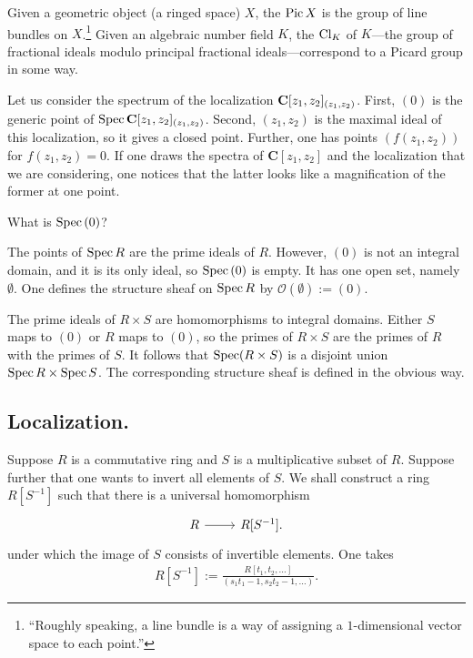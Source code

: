 \documentclass [11 pt, oneside] {article}
\begin{document}
\begin{remark}
	Given a geometric object (a ringed space) $X$, the  $\operatorname{Pic} X$ is the group of line bundles on $X$.\footnote{``Roughly speaking, a line bundle is a way of assigning a $1$-dimensional vector space to each point.''} Given an algebraic number field $K$, the  $\operatorname{Cl}_K$ of $K$---the group of fractional ideals modulo principal fractional ideals---correspond to a Picard group in some way.
\end{remark}

\begin{example}[ ]\label{}\text{}
Let us consider the spectrum of the localization $\mathbf C[z_1,z_2]_{(z_1,z_2)}$. First, $(0)$ is the generic point of $\operatorname{Spec} \mathbf C[z_1,z_2]_{(z_1,z_2)}$. Second, $(z_1,z_2)$ is the maximal ideal of this localization, so it gives a closed point. Further, one has points $(f(z_1,z_2))$ for $f(z_1,z_2)=0$. If one draws the spectra of $\mathbf{C}[z_1,z_2]$ and the localization that we are considering, one notices that the latter looks like a magnification of the former at one point.
\end{example}

\begin{problem}
	What is $\operatorname{Spec} \text{}(0)$?
\end{problem}

The points of $\operatorname{Spec} R$ are the prime ideals of $R$. However, $(0)$ is not an integral domain, and it is its only ideal, so $\operatorname{Spec} \text{}(0)$ is empty. It has one open set, namely $\emptyset$. One defines the structure sheaf on $\operatorname{Spec} R$ by $\mathscr{O}(\emptyset) :=  (0)$.

\begin{example}
	The prime ideals of $R\times S$ are homomorphisms to integral domains. Either $S$ maps to $(0)$ or $R$ maps to $(0)$, so the primes of $R\times S$ are the primes of $R$ with the primes of $S$. It follows that $\operatorname{Spec} (R\times S)$ is a disjoint union $\operatorname{Spec} R\times \operatorname{Spec} S$. The corresponding structure sheaf is defined in the obvious way.
\end{example}

\subsection{Localization.}
Suppose $R$ is a commutative ring and $S$ is a multiplicative subset of $R$. Suppose further that one wants to invert all elements of $S$. We shall construct a ring $R[S^{-1}]$ such that there is a universal homomorphism 
\[
\begin{tikzcd}
R\ar[r]& R[S^{-1}].
\end{tikzcd}
\]
under which the image of $S$ consists of invertible elements. One takes
\begin{align*}
	R[S^{-1}] := \frac{R[t_1,t_2,\hdots]}{(s_1t_1-1,s_2t_2-1,\hdots)}.
\end{align*}
\end{document}
